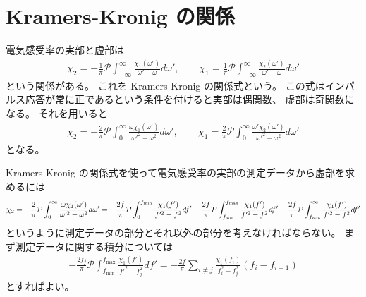 \documentclass[9pt,dvipdfmx,a4paper]{jsarticle}
\begin{document}
\section{Kramers-Kronig の関係}
電気感受率の実部と虚部は
\begin{align}
    \chi_2 = -\frac{1}{\pi}\mathcal{P}\int_{-\infty}^{\infty} \frac{\chi_1(\omega')}{\omega'-\omega} d\omega',\qquad
    \chi_1 =  \frac{1}{\pi}\mathcal{P}\int_{-\infty}^{\infty} \frac{\chi_2(\omega')}{\omega'-\omega} d\omega'
\end{align}
という関係がある。
これを Kramers-Kronig の関係式という。
この式はインパルス応答が常に正であるという条件を付けると実部は偶関数、
虚部は奇関数になる。
それを用いると
\begin{align}
    \chi_2 = -\frac{2}{\pi}\mathcal{P}\int_{0}^{\infty} \frac{\omega \chi_1(\omega')}{\omega'^2-\omega^2} d\omega',\qquad
    \chi_1 =  \frac{2}{\pi}\mathcal{P}\int_{0}^{\infty} \frac{\omega'\chi_2(\omega')}{\omega'^2-\omega^2} d\omega'
\end{align}
となる。

Kramers-Kronig の関係式を使って電気感受率の実部の測定データから虚部を求めるには
\begin{align}
    \chi_2
    = -\frac{2}{\pi}\mathcal{P}\int_{0}^{\infty} \frac{\omega \chi_1(\omega')}{\omega'^2-\omega^2} d\omega'\notag
    = -\frac{2f}{\pi}\mathcal{P}\int_{0}^{f_{\mathrm{min}}} \frac{\chi_1(f')}{f'^2-f^2} df'
       -\frac{2f}{\pi}\mathcal{P}\int_{f_\mathrm{min}}^{f_{\mathrm{max}}} \frac{\chi_1(f')}{f'^2-f^2} df'
       -\frac{2f}{\pi}\mathcal{P}\int_{f_\mathrm{min}}^{\infty} \frac{\chi_1(f')}{f'^2-f^2} df'
\end{align}
というように測定データの部分とそれ以外の部分を考えなければならない。
まず測定データに関する積分については
\begin{align}
-\frac{2f_j}{\pi}\mathcal{P}\int_{f_\mathrm{min}}^{f_{\mathrm{max}}} \frac{\chi_1(f')}{f'^2-f_j^2} df'
= -\frac{2f}{\pi}\sum_{i\neq j} \frac{\chi_1(f_i)}{f_i^2-f_j^2}(f_i-f_{i-1})
\end{align}
とすればよい。
\end{document}
